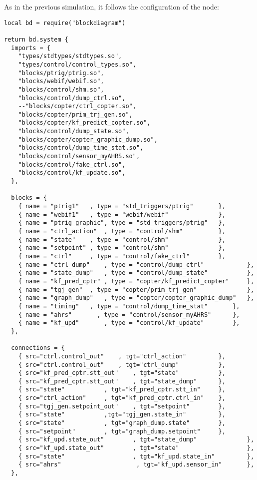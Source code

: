 As in the previous simulation, it follows the configuration of the node:

\begin{lstlisting}[language={[5.0]Lua},]
local bd = require("blockdiagram")

return bd.system {
  imports = {
    "types/stdtypes/stdtypes.so",
    "types/control/control_types.so",
    "blocks/ptrig/ptrig.so",
    "blocks/webif/webif.so",
    "blocks/control/shm.so",
    "blocks/control/dump_ctrl.so",
    --"blocks/copter/ctrl_copter.so",
    "blocks/copter/prim_trj_gen.so",
    "blocks/copter/kf_predict_copter.so",
    "blocks/control/dump_state.so",
    "blocks/copter/copter_graphic_dump.so",
    "blocks/control/dump_time_stat.so",
    "blocks/control/sensor_myAHRS.so",
    "blocks/control/fake_ctrl.so",
    "blocks/control/kf_update.so",
  },

  blocks = {
    { name = "ptrig1"	, type = "std_triggers/ptrig"		},
    { name = "webif1"	, type = "webif/webif"				},
    { name = "ptrig_graphic", type = "std_triggers/ptrig"	},
	{ name = "ctrl_action"	, type = "control/shm"			},
	{ name = "state"	, type = "control/shm"				},
	{ name = "setpoint"	, type = "control/shm"				},
	{ name = "ctrl"		, type = "control/fake_ctrl"		},
	{ name = "ctrl_dump"	, type = "control/dump_ctrl"			},
	{ name = "state_dump"	, type = "control/dump_state"			},
	{ name = "kf_pred_cptr"	, type = "copter/kf_predict_copter"		},
	{ name = "tgj_gen"	, type = "copter/prim_trj_gen"				},
	{ name = "graph_dump"	, type = "copter/copter_graphic_dump"	},
	{ name = "timing"	, type = "control/dump_time_stat"		},
	{ name = "ahrs"       , type = "control/sensor_myAHRS"    	},
	{ name = "kf_upd"       , type = "control/kf_update"    	},
  },

  connections = {
	{ src="ctrl.control_out"	, tgt="ctrl_action"			},
	{ src="ctrl.control_out" 	, tgt="ctrl_dump"			},
	{ src="kf_pred_cptr.stt_out"	, tgt="state"			},
	{ src="kf_pred_cptr.stt_out"	, tgt="state_dump"		},
	{ src="state"			, tgt="kf_pred_cptr.stt_in"		},
	{ src="ctrl_action"		, tgt="kf_pred_cptr.ctrl_in"	},
	{ src="tgj_gen.setpoint_out"	, tgt="setpoint"		},
	{ src="state"			,tgt="tgj_gen.state_in"			},
	{ src="state"			, tgt="graph_dump.state"		},
	{ src="setpoint"		, tgt="graph_dump.setpoint"		},
	{ src="kf_upd.state_out"        , tgt="state_dump"              },
	{ src="kf_upd.state_out"        , tgt="state"                   },
	{ src="state"                   , tgt="kf_upd.state_in"         },
	{ src="ahrs"                     , tgt="kf_upd.sensor_in"       },
  },
  

\end{lstlisting}
